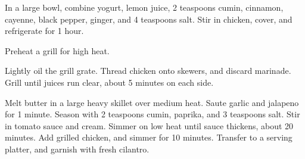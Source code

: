 
\info[servings=4,
		time = 140, 
		energy = 404,
		urlsource = http://allrecipes.com/recipe/45736/chicken-tikka-masala/]{}

\begin{ingredientsc}
	\begin{column}[Teaspoon]
	\end{column}
	\begin{column}[Tablespoon]
	\end{column}
	\begin{column}
	\end{column}
\end{ingredientsc}

\begin{preparation}
	\step In a large bowl, combine yogurt, lemon juice, 2 teaspoons cumin, cinnamon, cayenne, black pepper, ginger, and 4 teaspoons salt. Stir in chicken, cover, and refrigerate for 1 hour.
	
	\step Preheat a grill for high heat.
	
	\step Lightly oil the grill grate. Thread chicken onto skewers, and discard marinade. Grill until juices run clear, about 5 minutes on each side.
	
	\step Melt butter in a large heavy skillet over medium heat. Saute garlic and jalapeno for 1 minute. Season with 2 teaspoons cumin, paprika, and 3 teaspoons salt. Stir in tomato sauce and cream. Simmer on low heat until sauce thickens, about 20 minutes. Add grilled chicken, and simmer for 10 minutes. Transfer to a serving platter, and garnish with fresh cilantro.
\end{preparation}

\begin{notes}
\end{notes}

